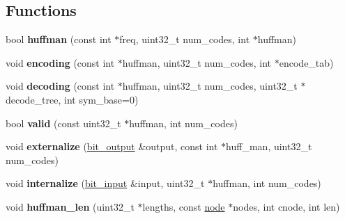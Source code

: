 \subsection*{Functions}
\begin{DoxyCompactItemize}
\item 
\mbox{\label{namespaceeka2l1_1_1flate_1_1huffman_a2d4ed9217393dc1659f40b15c182416d}} 
bool {\bfseries huffman} (const int $\ast$freq, uint32\+\_\+t num\+\_\+codes, int $\ast$huffman)
\item 
\mbox{\label{namespaceeka2l1_1_1flate_1_1huffman_aacceab23195315870b65a973097501a7}} 
void {\bfseries encoding} (const int $\ast$huffman, uint32\+\_\+t num\+\_\+codes, int $\ast$encode\+\_\+tab)
\item 
\mbox{\label{namespaceeka2l1_1_1flate_1_1huffman_aae795c80b9c8d8edf0736eff55285b68}} 
void {\bfseries decoding} (const int $\ast$huffman, uint32\+\_\+t num\+\_\+codes, uint32\+\_\+t $\ast$decode\+\_\+tree, int sym\+\_\+base=0)
\item 
\mbox{\label{namespaceeka2l1_1_1flate_1_1huffman_a7e23804f1f892ee7a9510cfcc4bb2cec}} 
bool {\bfseries valid} (const uint32\+\_\+t $\ast$huffman, int num\+\_\+codes)
\item 
\mbox{\label{namespaceeka2l1_1_1flate_1_1huffman_ad466e620009dc721b71c8cb4efa2368c}} 
void {\bfseries externalize} (\mbox{\hyperlink{classeka2l1_1_1flate_1_1bit__output}{bit\+\_\+output}} \&output, const int $\ast$huff\+\_\+man, uint32\+\_\+t num\+\_\+codes)
\item 
\mbox{\label{namespaceeka2l1_1_1flate_1_1huffman_a4bc23fdc6a00f373ffba4a0986fc5a8f}} 
void {\bfseries internalize} (\mbox{\hyperlink{classeka2l1_1_1flate_1_1bit__input}{bit\+\_\+input}} \&input, uint32\+\_\+t $\ast$huffman, int num\+\_\+codes)
\item 
\mbox{\label{namespaceeka2l1_1_1flate_1_1huffman_ade814f2975035f7fe68001220fa5da44}} 
void {\bfseries huffman\+\_\+len} (uint32\+\_\+t $\ast$lengths, const \mbox{\hyperlink{structeka2l1_1_1flate_1_1huffman_1_1node}{node}} $\ast$nodes, int cnode, int len)

\end{DoxyCompactItemize}

